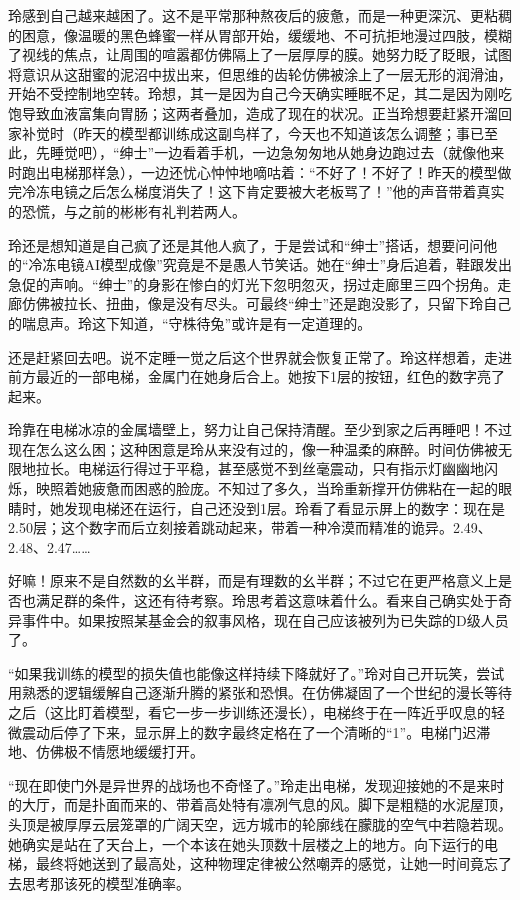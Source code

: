 玲感到自己越来越困了。这不是平常那种熬夜后的疲惫，而是一种更深沉、更粘稠的困意，像温暖的黑色蜂蜜一样从胃部开始，缓缓地、不可抗拒地漫过四肢，模糊了视线的焦点，让周围的喧嚣都仿佛隔上了一层厚厚的膜。她努力眨了眨眼，试图将意识从这甜蜜的泥沼中拔出来，但思维的齿轮仿佛被涂上了一层无形的润滑油，开始不受控制地空转。玲想，其一是因为自己今天确实睡眠不足，其二是因为刚吃饱导致血液富集向胃肠；这两者叠加，造成了现在的状况。正当玲想要赶紧开溜回家补觉时（昨天的模型都训练成这副鸟样了，今天也不知道该怎么调整；事已至此，先睡觉吧），“绅士”一边看着手机，一边急匆匆地从她身边跑过去（就像他来时跑出电梯那样急），一边还忧心忡忡地嘀咕着：“不好了！不好了！昨天的模型做完冷冻电镜之后怎么梯度消失了！这下肯定要被大老板骂了！”他的声音带着真实的恐慌，与之前的彬彬有礼判若两人。

玲还是想知道是自己疯了还是其他人疯了，于是尝试和“绅士”搭话，想要问问他的“冷冻电镜AI模型成像”究竟是不是愚人节笑话。她在“绅士”身后追着，鞋跟发出急促的声响。“绅士”的身影在惨白的灯光下忽明忽灭，拐过走廊里三四个拐角。走廊仿佛被拉长、扭曲，像是没有尽头。可最终“绅士”还是跑没影了，只留下玲自己的喘息声。玲这下知道，“守株待兔”或许是有一定道理的。

还是赶紧回去吧。说不定睡一觉之后这个世界就会恢复正常了。玲这样想着，走进前方最近的一部电梯，金属门在她身后合上。她按下1层的按钮，红色的数字亮了起来。

玲靠在电梯冰凉的金属墙壁上，努力让自己保持清醒。至少到家之后再睡吧！不过现在怎么这么困；这种困意是玲从来没有过的，像一种温柔的麻醉。时间仿佛被无限地拉长。电梯运行得过于平稳，甚至感觉不到丝毫震动，只有指示灯幽幽地闪烁，映照着她疲惫而困惑的脸庞。不知过了多久，当玲重新撑开仿佛粘在一起的眼睛时，她发现电梯还在运行，自己还没到1层。玲看了看显示屏上的数字：现在是2.50层；这个数字而后立刻接着跳动起来，带着一种冷漠而精准的诡异。2.49、2.48、2.47……

好嘛！原来不是自然数的幺半群，而是有理数的幺半群；不过它在更严格意义上是否也满足群的条件，这还有待考察。玲思考着这意味着什么。看来自己确实处于奇异事件中。如果按照某基金会的叙事风格，现在自己应该被列为已失踪的D级人员了。

“如果我训练的模型的损失值也能像这样持续下降就好了。”玲对自己开玩笑，尝试用熟悉的逻辑缓解自己逐渐升腾的紧张和恐惧。在仿佛凝固了一个世纪的漫长等待之后（这比盯着模型，看它一步一步训练还漫长），电梯终于在一阵近乎叹息的轻微震动后停了下来，显示屏上的数字最终定格在了一个清晰的“1”。电梯门迟滞地、仿佛极不情愿地缓缓打开。

“现在即使门外是异世界的战场也不奇怪了。”玲走出电梯，发现迎接她的不是来时的大厅，而是扑面而来的、带着高处特有凛冽气息的风。脚下是粗糙的水泥屋顶，头顶是被厚厚云层笼罩的广阔天空，远方城市的轮廓线在朦胧的空气中若隐若现。她确实是站在了天台上，一个本该在她头顶数十层楼之上的地方。向下运行的电梯，最终将她送到了最高处，这种物理定律被公然嘲弄的感觉，让她一时间竟忘了去思考那该死的模型准确率。

